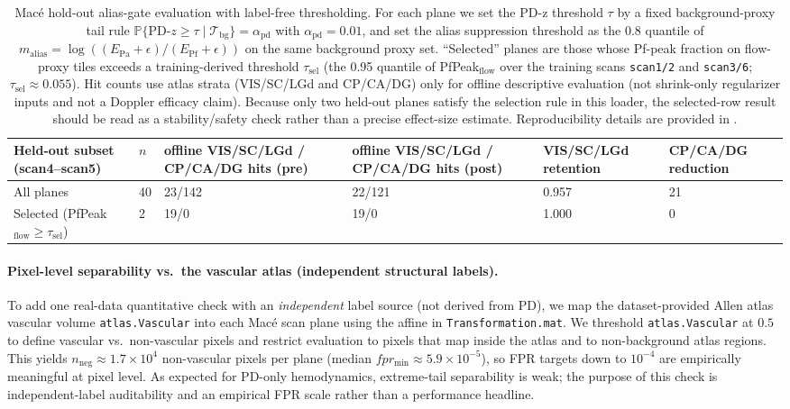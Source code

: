 \begin{table}[t]
\centering
\small
\begingroup
\setlength{\tabcolsep}{3pt}
\begin{tabular}{P{3.6cm} C{0.7cm} C{2.4cm} C{2.4cm} C{1.5cm} C{1.5cm}}
\hline
Held-out subset (scan4--scan5) & $n$ & offline VIS/\allowbreak SC/\allowbreak LGd / CP/\allowbreak CA/\allowbreak DG hits (pre) & offline VIS/\allowbreak SC/\allowbreak LGd / CP/\allowbreak CA/\allowbreak DG hits (post) & VIS/\allowbreak SC/\allowbreak LGd retention & CP/\allowbreak CA/\allowbreak DG reduction \\
\hline
All planes & 40 & 23/142 & 22/121 & 0.957 & 21 \\
Selected (PfPeak$_{\mathrm{flow}}\ge\tau_{\mathrm{sel}}$) & 2 & 19/0 & 19/0 & 1.000 & 0 \\
\hline
\end{tabular}
\endgroup
\caption{Mac{\'e} hold-out alias-gate evaluation with label-free thresholding. For each plane we set the PD-z threshold $\tau$ by a fixed background-proxy tail rule $\mathbb{P}\{\mathrm{PD}\text{-}z\ge\tau\mid\mathcal{T}_{\mathrm{bg}}\}=\alpha_{\mathrm{pd}}$ with $\alpha_{\mathrm{pd}}=0.01$, and set the alias suppression threshold as the $0.8$ quantile of $m_{\mathrm{alias}}=\log((E_{\mathrm{Pa}}+\epsilon)/(E_{\mathrm{Pf}}+\epsilon))$ on the same background proxy set. ``Selected'' planes are those whose Pf-peak fraction on flow-proxy tiles exceeds a training-derived threshold $\tau_{\mathrm{sel}}$ (the 0.95 quantile of PfPeak$_{\mathrm{flow}}$ over the training scans \texttt{scan1/2} and \texttt{scan3/6}; $\tau_{\mathrm{sel}}\approx 0.055$). Hit counts use atlas strata (VIS/SC/LGd and CP/CA/DG) only for offline descriptive evaluation (not shrink-only regularizer inputs and not a Doppler efficacy claim). Because only two held-out planes satisfy the selection rule in this loader, the selected-row result should be read as a stability/safety check rather than a precise effect-size estimate. Reproducibility details are provided in .}
\label{tab:mace_holdout_alias_gate}
\end{table}

\paragraph{Pixel-level separability vs.\ the vascular atlas (independent structural labels).}
To add one real-data quantitative check with an \emph{independent} label source (not derived from PD), we map the dataset-provided Allen atlas vascular volume \texttt{atlas.Vascular} into each Mac{\'e} scan plane using the affine in \texttt{Transformation.mat}. We threshold \texttt{atlas.Vascular} at $0.5$ to define vascular vs.\ non-vascular pixels and restrict evaluation to pixels that map inside the atlas and to non-background atlas regions. This yields $n_{\mathrm{neg}}\approx 1.7\times 10^4$ non-vascular pixels per plane (median $fpr_{\min}\approx 5.9\times 10^{-5}$), so FPR targets down to $10^{-4}$ are empirically meaningful at pixel level.
As expected for PD-only hemodynamics, extreme-tail separability is weak; the purpose of this check is independent-label auditability and an empirical FPR scale rather than a performance headline.

